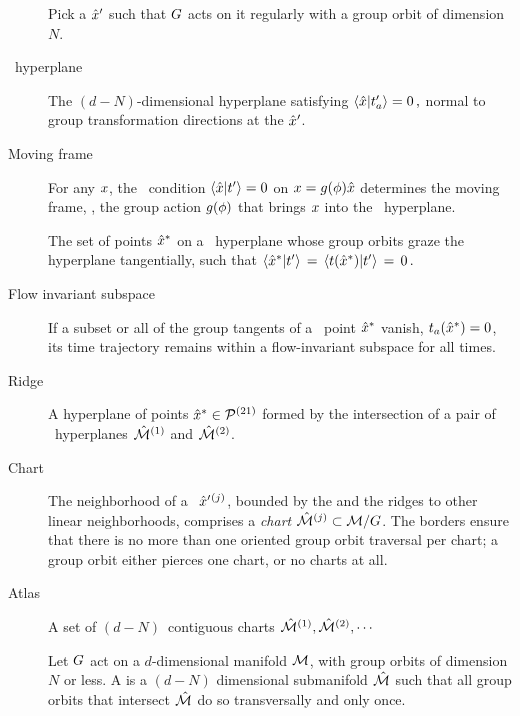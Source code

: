 \documentclass[aip,cha,reprint,
secnumarabic,
nofootinbib, tightenlines,
nobibnotes, showkeys, showpacs,
groupedaddress
]{revtex4-1}
\begin{document}
\begin{description}

\item[\Template]
Pick a {\template} ${\hat{x}'}$ such that $G$ acts on it
regularly with a group orbit of dimension $N$.

\item[\Slice\ hyperplane]
The $(d\!-\!N)$-dimensional hyperplane satisfying
\( %
\braket{\sspRed}{\sliceTan{a}}=0
\,,
\) %
normal to group transformation directions at the {\template} ${\hat{x}'}$.

\item[Moving frame]
For any $x$, the \slice\ condition $\braket{\sspRed}{\sliceTan{}}=0$
on $x = g({\bf \phi})\hat{x}$ determines the moving frame, \ie, the
group action $g({\bf \phi})$ that brings $ x$ into the \slice\
hyperplane.

\item[\ChartBord]
The set of points $\hat{x}^\ast$ on a \slice\ hyperplane whose group orbits
graze the hyperplane tangentially, such that
$\braket{\sspRSing}{\sliceTan{}} \,=\,
\braket{\groupTan(\sspRSing)}{\sliceTan{}} \,=\, 0 \,.$

\item[Flow invariant subspace]
If a subset or all of the group tangents of a \chartBord\ point
$\hat{x}^\ast$ vanish, $t_a(\hat{x}^\ast)=0$, its time  trajectory
remains within a flow-invariant subspace for all times.

\item[Ridge]
A hyperplane of points $\hat{x}^* \in {\cal P}{}^{(21)}$ formed by the
intersection of a pair of \slice\ hyperplanes $\hat{\cal M}{}^{(1)}$ and
$\hat{\cal M}{}^{(2)}$.

\item[Chart]
The neighborhood of a \template\ ${\hat{x}'}{}^{(j)}$, bounded by the
{\chartBord} and the ridges to other linear neighborhoods, comprises
a \emph{chart} $\hat{\cal M}{}^{(j)} \subset {\cal M}/G$. The
borders ensure that there is no more than one oriented group orbit traversal per chart;
a group orbit either pierces one chart, or no charts at all.

\item[Atlas]
A set of $(d\!-\!N)$\dmn\ contiguous charts $\hat{\cal M}{}^{(1)},
\hat{\cal M}{}^{(2)}, \cdots$

\item[\Slice]
Let $G$ act on a $d$-dimensional manifold ${\cal M}$, with group
orbits of dimension $N$ or less. A \emph{\slice} is a $(d\!-\!N)$
dimensional submanifold $\hat{\cal M}$ such that all group orbits that
intersect $\hat{\cal M}$ do so transversally and only once.

\end{description}
\end{document}
